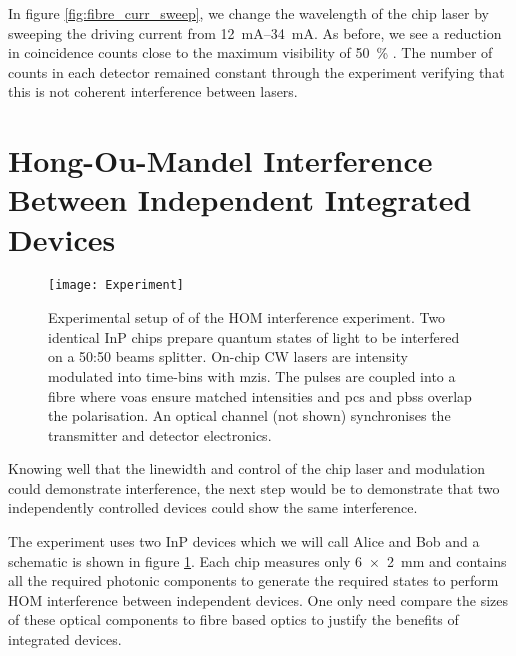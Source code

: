 In figure \ref{fig:fibre_curr_sweep}, we change the wavelength of the chip laser by sweeping the driving current from \SIrange{12}{34}{mA}. As before, we see a reduction in coincidence counts close to the maximum visibility of \SI{50}{\percent} \cite{Rarity2005}. The number of counts in each detector remained constant through the experiment verifying that this is not coherent interference between lasers.

\section{Hong-Ou-Mandel Interference Between Independent Integrated Devices}

\begin{figure}[tp]
	\centering
	\texttt{[image: Experiment]}
	\caption[Hong-Ou-Mandel interference experimental setup]{Experimental setup of of the \ac{HOM} interference experiment. Two identical \ac{InP} chips prepare quantum states of light to be interfered on a {50:50} beams splitter. On-chip \ac{CW} lasers are intensity modulated into time-bins with \acp{mzi}. The pulses are coupled into a fibre where \acp{voa} ensure matched intensities and \acp{pc} and \acp{pbs} overlap the polarisation. An optical channel (not shown) synchronises the transmitter and detector electronics.}
	\label{fig:hom_experiment}
\end{figure}

Knowing well that the linewidth and control of the chip laser and modulation could demonstrate interference, the next step would be to demonstrate that two independently controlled devices could show the same interference. 

The experiment uses two \ac{InP} devices which we will call Alice and Bob and a schematic is shown in figure \ref{fig:hom_experiment}. Each chip measures only \SI{6x2}{mm} and contains all the required photonic components to generate the required states to perform \ac{HOM} interference between independent devices. One only need compare the sizes of these optical components to fibre based optics to justify the benefits of integrated devices.



